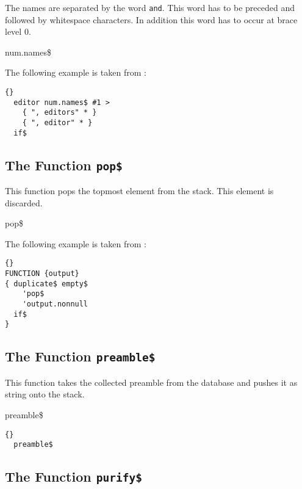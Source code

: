 The names are separated by the word \texttt{and}. This word
has to be preceded and followed by whitespace characters. In addition
this word has to occur at brace level 0.

\begin{BstFunction}{num.names\$}
\end{BstFunction}

The following example is taken from :

\begin{lstlisting}{}
  editor num.names$ #1 >
    { ", editors" * }
    { ", editor" * }
  if$
\end{lstlisting}\fctIndex{>}\fctIndex{*}


\subsection{The Function \texttt{pop\$}}%

This function pops the topmost element from the stack. This element is
discarded.

\begin{BstFunction}{pop\$}
\end{BstFunction}

The following example is taken from :

\begin{lstlisting}{}
FUNCTION {output}
{ duplicate$ empty$
    'pop$
    'output.nonnull
  if$
}
\end{lstlisting}

\subsection{The Function \texttt{preamble\$}}%

This function takes the collected preamble from the database and
pushes it as string onto the stack.

\begin{BstFunction}{preamble\$}
\end{BstFunction}

\begin{lstlisting}{}
  preamble$
\end{lstlisting}


\subsection{The Function \texttt{purify\$}}%


